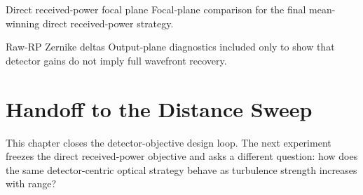   {Direct received-power focal plane}
  {Focal-plane comparison for the final mean-winning direct received-power
  strategy.}

  {Raw-RP Zernike deltas}
  {Output-plane diagnostics included only to show that detector gains do not
  imply full wavefront recovery.}

\section{Handoff to the Distance Sweep}

This chapter closes the detector-objective design loop. The next experiment
freezes the direct received-power objective and asks a different question: how does the same
detector-centric optical strategy behave as turbulence strength increases with
range?
